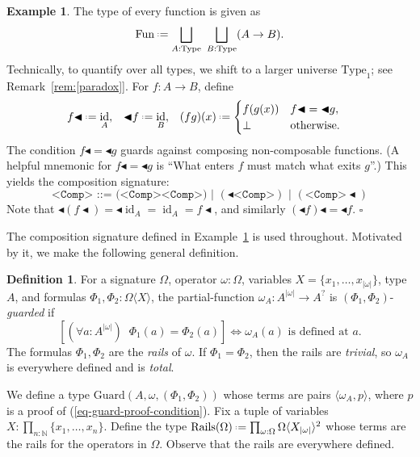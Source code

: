 \documentclass{amsart}
\newcommand{\tin}{:}
\numberwithin{lstfloat}{section}
\newcommand{\Free}[2]{#1\langle #2\rangle}
\DeclareMathOperator{\id}{id}
\newcommand{\srcfunc}{\mathbin{\blacktriangleleft}}
\newcommand{\tgtfunc}{\mathbin{\blacktriangleleft}}
\newcommand{\src}[1]{#1\srcfunc}
\newcommand{\tgt}[1]{\tgtfunc #1}
\newcommand{\type}[1]{#1}
\newcommand{\defeq}{\mathrel{\hstretch{.13}{=}\hspace{.2ex}{=}}}
\newcommand{\exqed}{\hfill $\square$}
\newcommand{\pf}{p}
\theoremstyle{definition}
\newtheorem{defn}[thm]{Definition}
\newtheorem{ex}[thm]{Example}
\theoremstyle{remark}
\numberwithin{equation}{section}
\begin{document}
\begin{ex}
\label{ex:fun-Eastern}
  The type of every function is given as 
  \[
    \mathrm{Fun}\defeq\bigsqcup_{\type{A}:\mathrm{Type}}~\bigsqcup_{\type{B}:\mathrm{Type}}(\type{A}\to \type{B}).
  \] 
  Technically, to quantify over all types, we shift  to a larger 
  universe $\text{Type}_1$; see Remark~\ref{rem:[paradox]}.
  For $f:\type{A}\to\type{B}$, define
  \begin{align*}
    \src{f} & \defeq \id_{A},
    &
    \tgt{f} & \defeq \id_{B},
    &
    (fg)(x) & \defeq \begin{cases} 
        f(g(x)) & \src{f}=\tgt{g},\\
        \bot & \text{otherwise}.
    \end{cases}
  \end{align*}
   The condition $\src{f}=\tgt{g}$ guards against composing non-composable functions.
  (A helpful mnemonic for $\src{f}=\tgt{g}$ is ``What enters $f$ must match what
  exits $g$''.) This yields the composition signature:
  \begin{equation*}
    \texttt{<Comp> ::= (<Comp><Comp>) | }(\tgt{\texttt{<Comp>}})\texttt{ | }(\src{\texttt{<Comp>}})
  \end{equation*}
  Note that $\tgt{(\src{f})}=\tgt{\id_{A}}=\id_{A}=\src{f}$, and similarly $\src{(\tgt{f})}=\tgt{f}$.
\exqed
\end{ex}

The composition signature defined in Example~\ref{ex:fun-Eastern} is used throughout.
Motivated by it, we make the following general definition.

\begin{defn}
  For a signature $\Omega$,  operator
  $\omega\tin\Omega$, variables $X=\{x_1,\dots, x_{|\omega|}\}$, type $\type{A}$, and formulas $\Phi_1,\Phi_2\tin
  \Free{\Omega}{X}$, the  partial-function
  $\omega_{\type{A}} :\type{A}^{|\omega|}\to \type{A}^?$ is
  $(\Phi_1,\Phi_2)$-\emph{guarded} if 
  \begin{equation} \label{eq-guard-proof-condition}
    \left[(\forall a\tin \type{A}^{|\omega|})\;\;
    \Phi_1(a) = \Phi_2(a)\right] \iff 
    \omega_\type{A}(a)\text{ is defined at $a$}.
  \end{equation}
  The formulas $\Phi_1,\Phi_2$ are the
  \emph{rails} of $\omega$. If $\Phi_1 = \Phi_2$,
  then the rails are \textit{trivial}, so $\omega_A$ is everywhere
  defined and 
is \emph{total}. 
\end{defn}

We define a type $\mathrm{Guard}(\type{A},\omega, (\Phi_1,\Phi_2))$ whose terms
are pairs $\langle \omega_{\type{A}}, \pf\rangle$, where $\pf$ is a proof of
(\ref{eq-guard-proof-condition}). Fix a tuple of variables $X : \prod_{n\tin
\mathbb{N}}\{x_1,\dots, x_n\}$. Define the type $\mathrm{Rails}(\Omega) \defeq
\prod_{\omega\tin \Omega}\Omega\langle X_{|\omega|}\rangle^2$ whose terms are
the rails for the operators in $\Omega$. Observe that the rails are everywhere
defined. 
\end{document}
